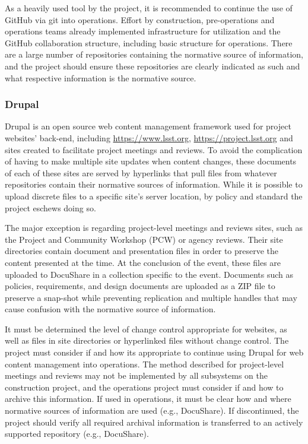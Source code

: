 As a heavily used tool by the project, it is recommended to continue the use of GitHub via git into operations.
Effort by construction, pre-operations and operations teams already implemented infrastructure for utilization and the GitHub collaboration structure, including basic structure for operations.
There are a large number of repositories containing the normative source of information, and the project should ensure these repositories are clearly indicated as such and what respective information is the normative source.

\subsubsection{Drupal}

Drupal \citep{drupal-cite} is an open source web content management framework used for project websites’ back-end, including \url{https://www.lsst.org}, \url{https://project.lsst.org} and sites created to facilitate project meetings and reviews.
To avoid the complication of having to make multiple site updates when content changes, these documents of each of these sites are served by hyperlinks that pull files from whatever repositories contain their normative sources of information.
While it is possible to upload discrete files to a specific site’s server location, by policy and standard the project eschews doing so.

The major exception is regarding project-level meetings and reviews sites, such as the Project and Community Workshop (PCW) or agency reviews.
Their site directories contain document and presentation files in order to preserve the content presented at the time.
At the conclusion of the event, these files are uploaded to DocuShare in a collection specific to the event.
Documents such as policies, requirements, and design documents are uploaded as a ZIP file to preserve a snap-shot while preventing replication and multiple handles that may cause confusion with the normative source of information.

It must be determined the level of change control appropriate for websites, as well as files in site directories or hyperlinked files without change control.
The project must consider if and how its appropriate to continue using Drupal for web content management into operations.
The method described for project-level meetings and reviews may not be implemented by all subsystems on the construction project, and the operations project must consider if and how to archive this information.
If used in operations, it must be clear how and where normative sources of information are used (e.g., DocuShare).
If discontinued, the project should verify all required archival information is transferred to an actively supported repository (e.g., DocuShare).

